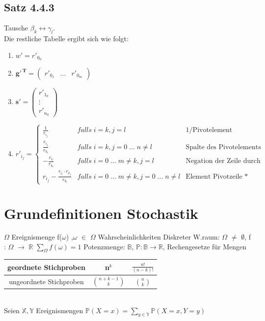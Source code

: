 \documentclass[]{article}
\begin{document}
\subsection*{Satz 4.4.3}
Tausche $ \beta_k \leftrightarrow \gamma_l $.\\Die restliche Tabelle ergibt sich wie folgt:\\
\begin{enumerate}
	\item $ w'=r'_{0_0} $
	\item $ \mathbf{g'^{\,T}} =\begin{pmatrix}r'_{0_1} & \dots & r'_{0_m}\end{pmatrix} $
	\item $ \mathbf{s'}=\begin{pmatrix}r'_{1_0}\\\vdots\\r'_{n_0}\end{pmatrix} $
	\item 	$ r'_{i_j}=\left\{\begin{array}{lc|c|}\frac1{r_{i_j}}&falls\;i=k,j=l &\text{1/Pivotelement}\\
	\frac{r_{i_j}}{r_{k_l}}&falls\;i=k,j=0\;...\;n\neq l&\text{Spalte des Pivotelements durch Pivotelement}\\
	-\frac{r_{i_l}}{r_{k_l}}&falls\;i=0\;...\;m\neq k,j=l&\text{Negation der Zeile durch Pivotelement}\\
	r_{i_j}-\frac{r_{i_l}\cdot r_{k_j}}{r_{k_l}}&falls\;i=0\;...\;m\neq k,j=0\;...\;n\neq l&\text{Element Pivotzeile * Pivotspalte / Pivotelement}\end{array}\right. $
\end{enumerate}
\newpage
\section{Grundefinitionen Stochastik}
$\Omega$ Ereignismenge
f($\omega$) ,$\omega$ $\in$ $\Omega$ Wahrscheinlichkeiten
Diskreter W.raum: 
$\Omega$ $\neq$ $\emptyset$, f : $\Omega$ $\rightarrow$ $\mathbb{R}$ $\sum_\Omega f(\omega) = 1$
Potenzmenge: $\mathbb{B}$, $\mathbb{P}: \mathbb{B} \rightarrow \mathbb{R}$,
Rechengesetze für Mengen

\begin{tabular}{|c|c|c|}
	\hline 
	geordnete Stichproben & n$^k$ & $\frac{n!}{(n-k)!}$ \\ 
	\hline 
	ungeordnete Stichproben  & $\binom{n+k-1}{k}$ & $\binom{n}{k}$ \\ 
	\hline 
\end{tabular}\\
    Seien $\mathbb{X}, \mathbb{Y}$ Ereignismengen
	$\mathbb{P}(X = x) = \sum_{y \in \mathbb{Y}} \mathbb{P}(X = x, Y = y)$
\end{document}
